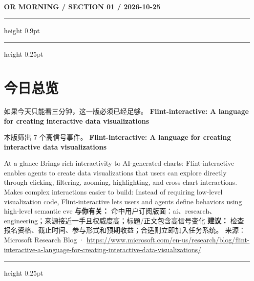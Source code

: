 \documentclass[10.5pt]{ctexart}
\begin{document}
{\small\bfseries OR MORNING / SECTION 01 / 2026-10-25}
\vspace{2mm}
\hrule height 0.9pt
\vspace{1.5mm}
\hrule height 0.25pt
\vspace{4mm}
\section*{今日总览}
{\color{ormuted} 如果今天只能看三分钟，这一版必须已经足够。}
\vspace{2mm}
{\fontsize{25}{29}\selectfont\bfseries Flint-interactive: A language for creating interactive data visualizations}\par
\vspace{2mm}
{\large 本版筛出 7 个高信号事件。}
\vspace{3mm}
{\Large\bfseries Flint-interactive: A language for creating interactive data visualizations}\par
At a glance Brings rich interactivity to AI-generated charts: Flint-interactive enables agents to create data visualizations that users can explore directly through clicking, filtering, zooming, highlighting, and cross-chart interactions. Makes complex interactions easier to build: Instead of requiring low-level visualization code, Flint-interactive lets users and agents define behaviors using high-level semantic eve
\textbf{与你有关：} 命中用户订阅版面：ai、research、engineering；来源接近一手且权威度高；标题/正文包含高信号变化
\textbf{建议：} 检查报名资格、截止时间、参与形式和预期收益；合适则立即加入任务系统。
{\footnotesize\color{ormuted} 来源：Microsoft Research Blog · \url{https://www.microsoft.com/en-us/research/blog/flint-interactive-a-language-for-creating-interactive-data-visualizations/}}
\vspace{3mm}
\hrule height 0.25pt
\vspace{3mm}
\end{document}
